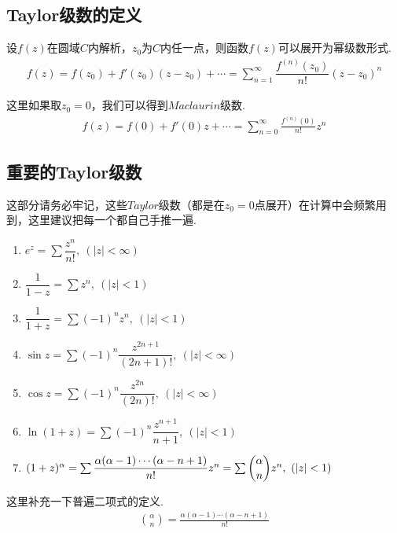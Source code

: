     \subsection{Taylor级数的定义}
        \begin{definition}[Taylor级数]\label{def:taylor_series}
            设$f(z)$在圆域$C$内解析，$z_0$为$C$内任一点，则函数$f(z)$可以展开为幂级数形式.
            \begin{align}
                f(z)=f(z_0)+f'(z_0)(z-z_0)+\cdots
                =\sum_{n=1}^{\infty}\dfrac{f^{(n)}(z_0)}{n!}(z-z_0)^n
            \end{align}
        \end{definition}
        \begin{definition}[Maclaurin级数]\label{def:maclaurin_series}
            这里如果取$z_0=0$，我们可以得到$Maclaurin$级数.
            \begin{align*}
                f(z)=f(0)+f'(0)z+\cdots=\sum_{n=0}^{\infty}\frac{f^{(n)}(0)}{n!}z^n
            \end{align*}
        \end{definition}

    \subsection{重要的Taylor级数}
        这部分请务必牢记，这些$Taylor$级数（都是在$z_0=0$点展开）在计算中会频繁用到，这里建议把每一个都自己手推一遍.
        \begin{enumerate}
            \item $e^z = \sum\dfrac{z^n}{n!},\ (|z|<\infty)$
            \item $\dfrac{1}{1-z}=\sum z^n,\ (|z|<1)$
            \item $\dfrac{1}{1+z}=\sum (-1)^n z^n,\ (|z|<1)$
            \item $\sin{z}=\sum(-1)^n\dfrac{z^{2n+1}}{(2n+1)!},\ (|z|<\infty)$
            \item $\cos{z}=\sum(-1)^n\dfrac{z^{2n}}{(2n)!},\ (|z|<\infty)$
            \item $\ln{(1+z)}=\sum(-1)^n\dfrac{z^{n+1}}{n+1},\ (|z|<1)$
            \item $(1+z)^\alpha=\sum\dfrac{\alpha(\alpha-1)\cdots(\alpha-n+1)}{n!}z^n=\sum\dbinom{\alpha}{n}z^n,\ (|z|<1)$
        \end{enumerate}

        \begin{note}
            这里补充一下普遍二项式的定义.
            \begin{align*}
                \binom{\alpha}{n}=\frac{\alpha(\alpha-1)\cdots(\alpha-n+1)}{n!}
            \end{align*}
        \end{note}

